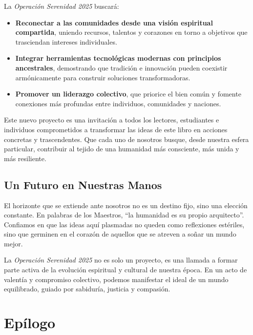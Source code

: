 \documentclass[
]{book}
\providecommand{\tightlist}{%
  \setlength{\itemsep}{0pt}\setlength{\parskip}{0pt}}
\begin{document}
La \emph{Operación Serenidad 2025} buscará:

\begin{itemize}
\tightlist
\item
  \textbf{Reconectar a las comunidades desde una visión espiritual compartida}, uniendo recursos, talentos y corazones en torno a objetivos que trasciendan intereses individuales.\\
\item
  \textbf{Integrar herramientas tecnológicas modernas con principios ancestrales}, demostrando que tradición e innovación pueden coexistir armónicamente para construir soluciones transformadoras.\\
\item
  \textbf{Promover un liderazgo colectivo}, que priorice el bien común y fomente conexiones más profundas entre individuos, comunidades y naciones.
\end{itemize}

Este nuevo proyecto es una invitación a todos los lectores, estudiantes e individuos comprometidos a transformar las ideas de este libro en acciones concretas y trascendentes. Que cada uno de nosotros busque, desde nuestra esfera particular, contribuir al tejido de una humanidad más consciente, más unida y más resiliente.

\section{Un Futuro en Nuestras Manos}\label{un-futuro-en-nuestras-manos}

El horizonte que se extiende ante nosotros no es un destino fijo, sino una elección constante. En palabras de los Maestros, ``la humanidad es su propio arquitecto''. Confiamos en que las ideas aquí plasmadas no queden como reflexiones estériles, sino que germinen en el corazón de aquellos que se atreven a soñar un mundo mejor.

La \emph{Operación Serenidad 2025} no es solo un proyecto, es una llamada a formar parte activa de la evolución espiritual y cultural de nuestra época. En un acto de valentía y compromiso colectivo, podemos manifestar el ideal de un mundo equilibrado, guiado por sabiduría, justicia y compasión.

\chapter*{Epílogo}\label{epuxedlogo}
\end{document}
